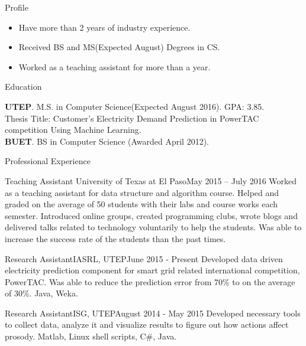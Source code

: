 \documentclass[]{mcdowellcv}
\begin{document}
	\makeheader
	
	\begin{cvsection}{Profile}
	\begin{cvsubsection}{}{}{}
		\begin{itemize}
				\item Have more than 2 years of industry experience.
				\item Received BS and MS(Expected August) Degrees in CS.
				\item Worked as a teaching assistant for more than a year.
			\end{itemize}
	\end{cvsubsection}
	\end{cvsection}
	
	\begin{cvsection}{Education}
		\begin{cvsubsection}{}{}{}
				\textbf{UTEP}. M.S. in Computer Science(Expected August 2016). GPA: 3.85. \\
				Thesis Title: Customer's Electricity Demand Prediction in PowerTAC competition Using Machine Learning. \\
				\textbf{BUET}. BS in Computer Science (Awarded April 2012).  
		\end{cvsubsection}
	\end{cvsection}

	\begin{cvsection}{Professional Experience}
		
		\begin{cvsubsection}{Teaching Assistant }{University of Texas at El Paso}{May 2015 -- July 2016}
		Worked as a teaching assistant for data structure and algorithm course. Helped and graded on the average of 50 students with their labs and course works each semester. Introduced online groups, created programming clubs, wrote blogs and delivered talks related to technology voluntarily to help the students. Was able to increase the success rate of the students than the past times. 
\end{cvsubsection}		
		\begin{cvsubsection}{Research Assistant}{IASRL, UTEP}{June 2015 - Present}
			Developed data driven electricity prediction component for smart grid related international competition, PowerTAC. Was able to reduce the prediction error from 70\% to on the average of 30\%. Java, Weka.
		\end{cvsubsection}
		
		\begin{cvsubsection}{Research Assistant}{ISG, UTEP}{August 2014 - May 2015} 
			Developed necessary tools to collect data, analyze it and visualize results to figure out how actions affect prosody. Matlab, Linux shell scripts, C\#, Java.
		\end{cvsubsection}
		
	\end{cvsection}
	
\end{document}
